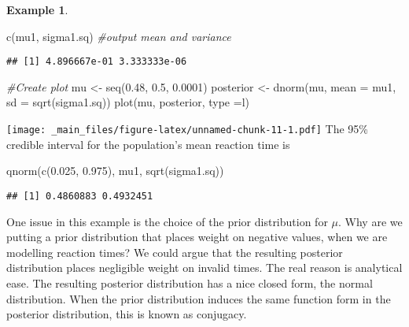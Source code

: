 \documentclass[
]{book}
\newenvironment{Shaded}{\begin{snugshade}}{\end{snugshade}}
\newcommand{\AttributeTok}[1]{\textcolor[rgb]{0.77,0.63,0.00}{#1}}
\newcommand{\CommentTok}[1]{\textcolor[rgb]{0.56,0.35,0.01}{\textit{#1}}}
\newcommand{\FloatTok}[1]{\textcolor[rgb]{0.00,0.00,0.81}{#1}}
\newcommand{\FunctionTok}[1]{\textcolor[rgb]{0.00,0.00,0.00}{#1}}
\newcommand{\NormalTok}[1]{#1}
\newcommand{\OtherTok}[1]{\textcolor[rgb]{0.56,0.35,0.01}{#1}}
\newcommand{\StringTok}[1]{\textcolor[rgb]{0.31,0.60,0.02}{#1}}
\theoremstyle{definition}
\theoremstyle{definition}
\newtheorem{example}{Example}[chapter]
\theoremstyle{definition}
\theoremstyle{definition}
\theoremstyle{remark}
\begin{document}
\begin{example}
\begin{Shaded}
\begin{Highlighting}[]
\FunctionTok{c}\NormalTok{(mu1, sigma1.sq) }\CommentTok{\#output mean and variance}
\end{Highlighting}
\end{Shaded}

\begin{verbatim}
## [1] 4.896667e-01 3.333333e-06
\end{verbatim}

\begin{Shaded}
\begin{Highlighting}[]
\CommentTok{\#Create plot}
\NormalTok{mu }\OtherTok{\textless{}{-}} \FunctionTok{seq}\NormalTok{(}\FloatTok{0.48}\NormalTok{, }\FloatTok{0.5}\NormalTok{, }\FloatTok{0.0001}\NormalTok{) }
\NormalTok{posterior }\OtherTok{\textless{}{-}} \FunctionTok{dnorm}\NormalTok{(mu, }\AttributeTok{mean =}\NormalTok{ mu1, }\AttributeTok{sd =} \FunctionTok{sqrt}\NormalTok{(sigma1.sq))}
\FunctionTok{plot}\NormalTok{(mu, posterior, }\AttributeTok{type =}\StringTok{\textquotesingle{}l\textquotesingle{}}\NormalTok{)}
\end{Highlighting}
\end{Shaded}

\texttt{[image: \_main\_files/figure-latex/unnamed-chunk-11-1.pdf]}
The 95\% credible interval for the population's mean reaction time is

\begin{Shaded}
\begin{Highlighting}[]
\FunctionTok{qnorm}\NormalTok{(}\FunctionTok{c}\NormalTok{(}\FloatTok{0.025}\NormalTok{, }\FloatTok{0.975}\NormalTok{), mu1, }\FunctionTok{sqrt}\NormalTok{(sigma1.sq))}
\end{Highlighting}
\end{Shaded}

\begin{verbatim}
## [1] 0.4860883 0.4932451
\end{verbatim}

\end{example}

One issue in this example is the choice of the prior distribution for \(\mu\). Why are we putting a prior distribution that places weight on negative values, when we are modelling reaction times? We could argue that the resulting posterior distribution places negligible weight on invalid times. The real reason is analytical ease. The resulting posterior distribution has a nice closed form, the normal distribution. When the prior distribution induces the same function form in the posterior distribution, this is known as conjugacy.
\end{document}
